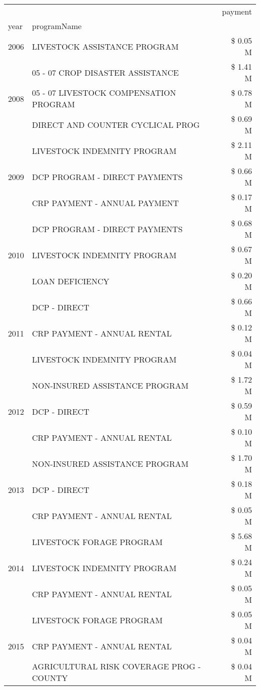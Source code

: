 \begin{tabular}{llr}
\toprule
 &  & payment \\
year & programName &  \\
\midrule
2006 & LIVESTOCK ASSISTANCE PROGRAM & \$ 0.05 M \\
\cline{1-3}
\multirow[t]{3}{*}{2008} & 05 - 07 CROP DISASTER ASSISTANCE & \$ 1.41 M \\
 & 05 - 07 LIVESTOCK COMPENSATION PROGRAM & \$ 0.78 M \\
 & DIRECT AND COUNTER CYCLICAL PROG & \$ 0.69 M \\
\cline{1-3}
\multirow[t]{3}{*}{2009} & LIVESTOCK INDEMNITY PROGRAM & \$ 2.11 M \\
 & DCP PROGRAM - DIRECT PAYMENTS & \$ 0.66 M \\
 & CRP PAYMENT - ANNUAL PAYMENT & \$ 0.17 M \\
\cline{1-3}
\multirow[t]{3}{*}{2010} & DCP PROGRAM - DIRECT PAYMENTS & \$ 0.68 M \\
 & LIVESTOCK INDEMNITY PROGRAM & \$ 0.67 M \\
 & LOAN DEFICIENCY & \$ 0.20 M \\
\cline{1-3}
\multirow[t]{3}{*}{2011} & DCP - DIRECT & \$ 0.66 M \\
 & CRP PAYMENT - ANNUAL RENTAL & \$ 0.12 M \\
 & LIVESTOCK INDEMNITY PROGRAM & \$ 0.04 M \\
\cline{1-3}
\multirow[t]{3}{*}{2012} & NON-INSURED ASSISTANCE PROGRAM & \$ 1.72 M \\
 & DCP - DIRECT & \$ 0.59 M \\
 & CRP PAYMENT - ANNUAL RENTAL & \$ 0.10 M \\
\cline{1-3}
\multirow[t]{3}{*}{2013} & NON-INSURED ASSISTANCE PROGRAM & \$ 1.70 M \\
 & DCP - DIRECT & \$ 0.18 M \\
 & CRP PAYMENT - ANNUAL RENTAL & \$ 0.05 M \\
\cline{1-3}
\multirow[t]{3}{*}{2014} & LIVESTOCK FORAGE PROGRAM & \$ 5.68 M \\
 & LIVESTOCK INDEMNITY PROGRAM & \$ 0.24 M \\
 & CRP PAYMENT - ANNUAL RENTAL & \$ 0.05 M \\
\cline{1-3}
\multirow[t]{3}{*}{2015} & LIVESTOCK FORAGE PROGRAM & \$ 0.05 M \\
 & CRP PAYMENT - ANNUAL RENTAL & \$ 0.04 M \\
 & AGRICULTURAL RISK COVERAGE PROG - COUNTY & \$ 0.04 M \\

\end{tabular}
